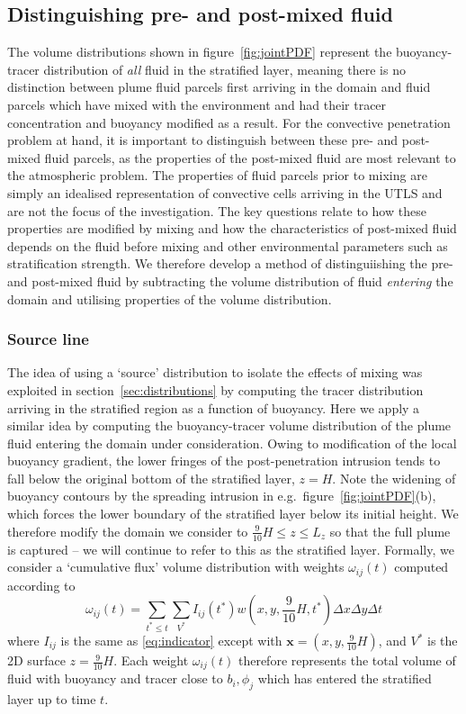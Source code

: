 \documentclass[a4paper]{article}
\begin{document}
\subsection{Distinguishing pre- and post-mixed fluid}
\label{sec:jointPDF}

The volume distributions shown in figure~\ref{fig:jointPDF} represent the buoyancy-tracer distribution of
\emph{all} fluid in the stratified layer, meaning there is no distinction between plume fluid parcels first
arriving in the domain and fluid parcels which have mixed with the environment and had their tracer
concentration and buoyancy modified as a result. For the convective penetration problem at hand, it is
important to distinguish between these pre- and post-mixed fluid parcels, as the properties of the post-mixed
fluid are most relevant to the atmospheric problem. The properties of fluid parcels prior to mixing are simply
an idealised representation of convective cells arriving in the UTLS and are not the focus of the
investigation. The key questions relate to how these properties are modified by mixing and how the
characteristics of post-mixed fluid depends on the fluid before mixing and other environmental parameters such
as stratification strength. We therefore develop a method of distinguiishing the pre- and post-mixed fluid by
subtracting the volume distribution of fluid \emph{entering} the domain and utilising properties of
the volume distribution.

\subsubsection{Source line}
The idea of using a `source' distribution to isolate the effects of mixing was exploited in
section~\ref{sec:distributions} by computing the tracer distribution arriving in the stratified region as a
function of buoyancy. Here we apply a similar idea by computing the buoyancy-tracer volume distribution of the
plume fluid entering the domain under consideration. Owing to modification of the local buoyancy gradient,
the lower fringes of the post-penetration intrusion tends to fall below the original bottom of the stratified
layer, $z=H$. Note the widening of buoyancy contours by the spreading intrusion in e.g.\
figure~\ref{fig:jointPDF}(b), which forces the lower boundary of the stratified layer below its initial
height. We therefore modify the domain we consider to $\frac{9}{10}H \le z \le L_z$ so that the full plume is
captured -- we will continue to refer to this as the stratified layer. Formally, we consider a `cumulative
flux' volume distribution with weights $\omega_{ij}(t)$ computed according to
\begin{equation}
	\omega_{ij}(t) = \sum_{t^* \le t} \sum_{V^*} I_{ij}(t^*) w(x, y, \frac{9}{10}H, t^*) \Delta x \Delta y
	\Delta t
\end{equation}
where $I_{ij}$ is the same as \eqref{eq:indicator} except with $\bm{x} = (x, y, \frac{9}{10}H)$, and $V^*$ is
the 2D surface $z=\frac{9}{10}H$. Each weight $\omega_{ij}(t)$ therefore represents the total volume of fluid
with buoyancy and tracer close to $b_i, \phi_j$ which has entered the stratified layer up to time $t$.
\end{document}

